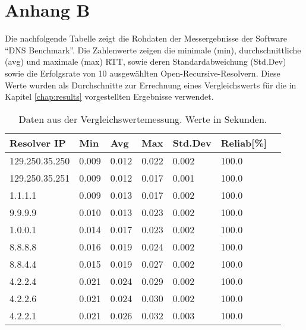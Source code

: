 \chapter*{Anhang B}
\label{chap:appB}

Die nachfolgende Tabelle zeigt die Rohdaten der Messergebnisse der Software ``DNS Benchmark''. Die Zahlenwerte zeigen die minimale (min), durchschnittliche (avg) und maximale (max) RTT, sowie deren Standardabweichung (Std.Dev) sowie die Erfolgsrate von 10 ausgewählten Open-Recursive-Resolvern. Diese Werte wurden als Durchschnitte zur Errechnung eines Vergleichswerts für die in Kapitel \ref{chap:results} vorgestellten Ergebnisse verwendet.

\begin{table}[ht]
\centering
\begin{tabular}{lllllll}
\hline
Resolver IP    & Min   & Avg   & Max   & Std.Dev & Reliab[\%] \\ \hline
129.250.35.250 & 0.009 & 0.012 & 0.022 & 0.002   & 100.0    \\
129.250.35.251 & 0.009 & 0.012 & 0.017 & 0.001   & 100.0    \\
1.1.1.1        & 0.009 & 0.013 & 0.017 & 0.002   & 100.0    \\
9.9.9.9        & 0.010 & 0.013 & 0.023 & 0.002   & 100.0    \\
1.0.0.1        & 0.014 & 0.017 & 0.023 & 0.002   & 100.0    \\
8.8.8.8        & 0.016 & 0.019 & 0.024 & 0.002   & 100.0    \\
8.8.4.4        & 0.015 & 0.019 & 0.027 & 0.002   & 100.0    \\
4.2.2.4        & 0.021 & 0.024 & 0.029 & 0.002   & 100.0    \\
4.2.2.6        & 0.021 & 0.024 & 0.030 & 0.002   & 100.0    \\
4.2.2.1        & 0.021 & 0.026 & 0.032 & 0.003   & 100.0    \\ \hline
\end{tabular}
\caption*{Daten aus der Vergleichswertemessung. Werte in Sekunden.}
\end{table}